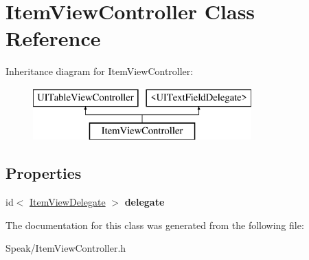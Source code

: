 \hypertarget{interface_item_view_controller}{}\section{Item\+View\+Controller Class Reference}
\label{interface_item_view_controller}
Inheritance diagram for Item\+View\+Controller\+:\begin{figure}[H]
\begin{center}
\leavevmode
\includegraphics[height=2.000000cm]{interface_item_view_controller}
\end{center}
\end{figure}
\subsection*{Properties}
\begin{DoxyCompactItemize}
\item 
\hypertarget{interface_item_view_controller_acd932f48989695fe651d892ba79a326a}{}id$<$ \hyperlink{protocol_item_view_delegate-p}{Item\+View\+Delegate} $>$ {\bfseries delegate}\label{interface_item_view_controller_acd932f48989695fe651d892ba79a326a}

\end{DoxyCompactItemize}


The documentation for this class was generated from the following file\+:\begin{DoxyCompactItemize}
\item 
Speak/Item\+View\+Controller.\+h\end{DoxyCompactItemize}
